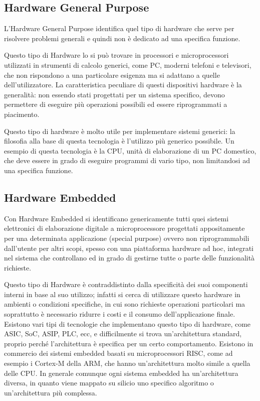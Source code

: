 \documentclass[a4paper,titlepage]{book}
\begin{document}
\subsection{Hardware General Purpose}
L'Hardware General Purpose identifica quel tipo di hardware che serve per risolvere problemi generali e quindi non è dedicato ad una specifica funzione. 

Questo tipo di Hardware lo si può trovare in processori e microprocessori utilizzati in strumenti di calcolo generici, come PC, moderni telefoni e televisori, che non rispondono a una particolare esigenza ma si adattano a quelle dell'utilizzatore. La caratteristica peculiare di questi dispositivi hardware è la generalità: non essendo stati progettati per un sistema specifico, devono permettere di eseguire più operazioni possibili ed essere riprogrammati a piacimento.

Questo tipo di hardware è molto utile per implementare sistemi generici: la filosofia alla base di questa tecnologia è l'utilizzo più generico possibile. Un esempio di questa tecnologia è la CPU, unità di elaborazione di un PC domestico, che deve essere in grado di eseguire programmi di vario tipo, non limitandosi ad una specifica funzione.

\subsection{Hardware Embedded}

Con Hardware Embedded si identificano genericamente tutti quei sistemi elettronici di elaborazione digitale a microprocessore progettati appositamente per una determinata applicazione (special purpose) ovvero non riprogrammabili dall'utente per altri scopi, spesso con una piattaforma hardware ad hoc, integrati nel sistema che controllano ed in grado di gestirne tutte o parte delle funzionalità richieste.

Questo tipo di Hardware è contraddistinto dalla specificità dei suoi componenti interni in base al suo utilizzo; infatti si cerca di utilizzare questo hardware in ambienti o condizioni specifiche, in cui sono richieste operazioni particolari ma soprattutto è necessario ridurre i costi e il consumo dell'applicazione finale.
Esistono  vari tipi di tecnologie che implementano questo tipo di hardware, come ASIC, SoC, ASIP, PLC, ecc, e difficilmente si trova un'architettura standard, proprio perché l'architettura è specifica per un certo comportamento. Esistono in commercio dei sistemi embedded basati su microprocessori RISC, come ad esempio i Cortex-M della ARM, che hanno un'architettura molto simile a quella delle CPU. In generale comunque ogni sistema embedded ha un'architettura diversa, in quanto viene mappato su silicio uno specifico algoritmo o un'architettura più complessa.
\end{document}
